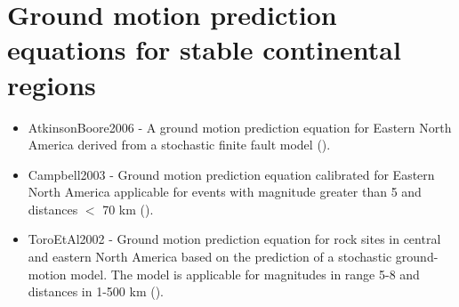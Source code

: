 \section{Ground motion prediction equations for stable continental regions}
\begin{itemize}
    \item AtkinsonBoore2006 - A ground motion prediction equation for Eastern North America derived from a
    stochastic finite fault model (\cite{atkinson2006}).
    \item Campbell2003 - Ground motion prediction equation calibrated for Eastern North America applicable
    for events with magnitude greater than 5 and distances $<$ 70 km (\cite{campbell2003}).
    \item ToroEtAl2002 - Ground motion prediction equation for rock sites in central and eastern North America
    based on the prediction of a stochastic ground-motion model. The model is applicable for magnitudes in range
    5-8 and distances in 1-500 km (\cite{toro2002}).
\end{itemize}
